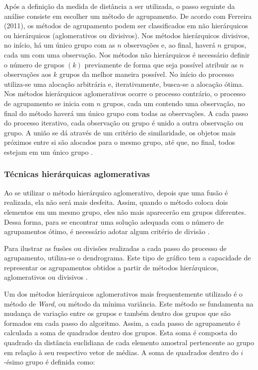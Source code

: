 \documentclass[
	12pt,				%
	openright,			%
	oneside,			%
	a4paper,			%
	chapter=TITLE,		%
	section=TITLE,		%
	english,			%
	french,				%
	spanish,			%
	brazil				%
	]{abntex2}
\begin{document}
Após a definição da medida de distância a ser utilizada, o passo seguinte da análise consiste em escolher um método de agrupamento. De acordo com Ferreira (2011), os métodos de agrupamento podem ser classificados em não hierárquicos ou hierárquicos (aglomerativos ou divisivos). Nos métodos hierárquicos divisivos, no início, há um único grupo com as $n$ observações e, ao final, haverá $n$ grupos, cada um com uma observação. Nos métodos não hierárquicos é necessário definir o número de grupos $(k)$ previamente de forma que seja possível atribuir as $n$ observações aos $k$ grupos da melhor maneira possível. No início do processo utiliza-se uma alocação arbitrária e, iterativamente, busca-se a alocação ótima. Nos métodos hierárquicos aglomerativos ocorre o processo contrário, o processo de agrupamento se inicia com $n$ grupos, cada um contendo uma observação, no final do método haverá um único grupo com todas as observações. A cada passo do processo iterativo, cada observação ou grupo é unido a outra observação ou grupo. A união se dá através de um critério de similaridade, os objetos mais próximos entre si são alocados para o mesmo grupo, até que, no final, todos estejam em um único grupo \cite{ferreira11}.

\subsubsection{Técnicas hierárquicas aglomerativas}

Ao se utilizar o método hierárquico aglomerativo, depois que uma fusão é realizada, ela não será mais desfeita. Assim, quando o método coloca dois elementos em um mesmo grupo, eles não mais aparecerão em grupos diferentes. Dessa forma, para se encontrar uma solução adequada com o número de agrupamentos ótimo, é necessário adotar algum critério de divisão \cite{everitt11}.

Para ilustrar as fusões ou divisões realizadas a cada passo do processo de agrupamento, utiliza-se o dendrograma. Este tipo de gráfico tem a capacidade de representar os agrupamentos obtidos a partir de métodos hierárquicos, aglomerativos ou divisivos \cite{everitt11}. 

Um dos métodos hierárquicos aglomerativos mais frequentemente utilizado é o método de \textit{Ward}, ou método da mínima variância. Este método se fundamenta na mudança de variação entre os grupos e também dentro dos grupos que são formados em cada passo do algoritmo. Assim, a cada passo de agrupamento é calculada a soma de quadrados dentro dos grupos. Esta soma é composta do quadrado da distância euclidiana de cada elemento amostral pertencente ao grupo em relação à seu respectivo vetor de médias. A soma de quadrados dentro do $i$-ésimo grupo é definida como:  
\end{document}
